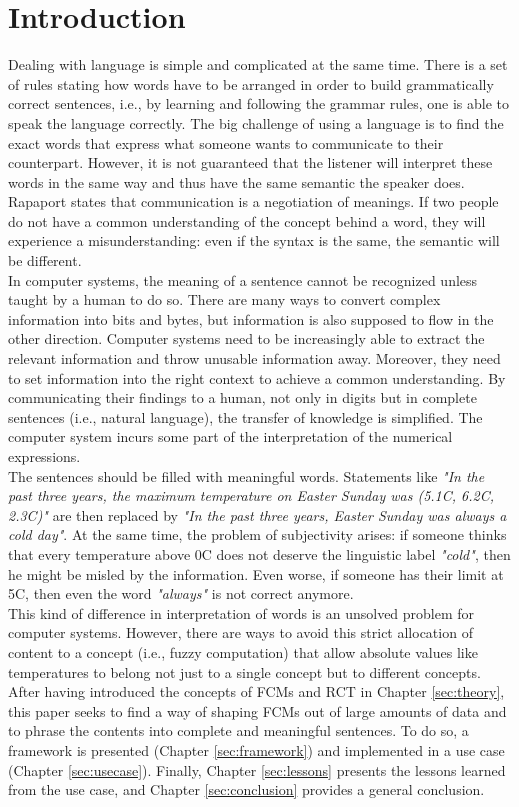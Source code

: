 \documentclass[conference]{IEEEtran}
\begin{document}
\section{Introduction}
Dealing with language is simple and complicated at the same time. There is a set of rules stating how words have to be arranged in order to build grammatically correct sentences, i.e., by learning and following the grammar rules, one is able to speak the language correctly. The big challenge of using a language is to find the exact words that express what someone wants to communicate to their counterpart. However, it is not guaranteed that the listener will interpret these words in the same way and thus have the same semantic the speaker does. Rapaport \cite{Rapaport2003} states that communication is a negotiation of meanings. If two people do not have a common understanding of the concept behind a word, they will experience a misunderstanding: even if the syntax is the same, the semantic will be different. \\
In computer systems, the meaning of a sentence cannot be recognized unless taught by a human to do so. There are many ways to convert complex information into bits and bytes, but information is also supposed to flow in the other direction. Computer systems need to be increasingly able to extract the relevant information and throw unusable information away. Moreover, they need to set information into the right context to achieve a common understanding. By communicating their findings to a human, not only in digits but in complete sentences (i.e., natural language), the transfer of knowledge is simplified. The computer system incurs some part of the interpretation of the numerical expressions.\\
The sentences should be filled with meaningful words. Statements like \emph{"In the past three years, the maximum temperature on Easter Sunday was (5.1\degree C, 6.2\degree C, 2.3\degree C)"} are then replaced by \emph{"In the past three years, Easter Sunday was always a cold day"}. At the same time, the problem of subjectivity arises: if someone thinks that every temperature above 0\degree C does not deserve the linguistic label \emph{"cold"}, then he might be misled by the information. Even worse, if someone has their limit at 5\degree C, then even the word \emph{"always"} is not correct anymore.\\
This kind of difference in interpretation of words is an unsolved problem for computer systems. However, there are ways to avoid this strict allocation of content to a concept (i.e., fuzzy computation) that allow absolute values like temperatures to belong not just to a single concept but to different concepts.\\
After having introduced the concepts of FCMs and RCT in Chapter \ref{sec:theory}, this paper seeks to find a way of shaping FCMs out of large amounts of data and to phrase the contents into complete and meaningful sentences. To do so, a framework is presented (Chapter \ref{sec:framework}) and implemented in a use case (Chapter \ref{sec:usecase}). Finally, Chapter \ref{sec:lessons} presents the lessons learned from the use case, and Chapter \ref{sec:conclusion} provides a general conclusion.\\
\end{document}
